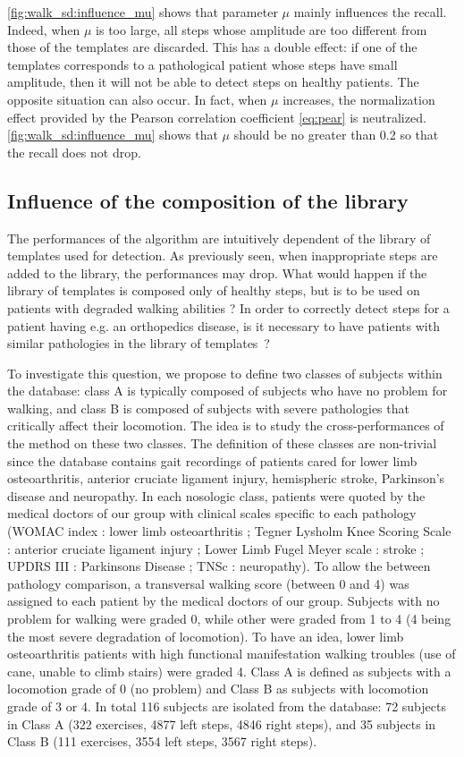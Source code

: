 \documentclass[../thesis.tex]{subfiles}
\begin{document}
\autoref{fig:walk_sd:influence_mu} shows that parameter $\mu$ mainly influences the recall. Indeed, when $\mu$ is too large, all steps whose amplitude are too different from those of the templates are discarded. This has a double effect: if one of the templates corresponds to a pathological patient whose steps have small amplitude, then it will not be able to detect steps on healthy patients. The opposite situation can also occur. In fact, when $\mu$ increases, the normalization effect provided by the Pearson correlation coefficient \eqref{eq:pear} is neutralized. \autoref{fig:walk_sd:influence_mu} shows that $\mu$ should be no greater than 0.2 so that the recall does not drop.



\subsection{Influence of the composition of the library}
\label{sub:walk_sd:library}

The performances of the algorithm are intuitively dependent of the library of templates used for detection. As previously seen, when inappropriate steps are added to the library, the performances may drop.  What would happen if the library of templates is composed only of healthy steps, but is to be used on patients with degraded walking abilities ? In order to correctly detect steps for a patient having e.g. an orthopedics disease, is it necessary to have patients with similar pathologies in the library of templates~? 

To investigate this question, we propose to define two classes of subjects within the database: class A is typically composed of subjects who have no problem for walking, and class B is composed of subjects with severe pathologies that critically affect their locomotion. The idea is to study the cross-performances of the method on these two classes. The definition of these classes are non-trivial since the database contains gait recordings of patients cared for lower limb osteoarthritis, anterior cruciate ligament injury, hemispheric stroke, Parkinson’s disease and neuropathy. In each nosologic class, patients were quoted by the medical doctors of our group with  clinical scales specific to each pathology (WOMAC index : lower limb osteoarthritis ; Tegner Lysholm Knee Scoring Scale : anterior cruciate ligament injury ; Lower Limb Fugel Meyer scale : stroke ; UPDRS III : Parkinsons Disease ; TNSc : neuropathy). To allow the between pathology comparison, a transversal walking score (between 0 and 4) was 
assigned to each patient by the medical doctors of our group.  Subjects with no problem for walking were graded 0, while other were graded from 1 to 4 (4 being the most severe degradation of locomotion). To have an idea, lower limb osteoarthritis patients with high functional manifestation walking troubles (use of cane, unable to climb stairs) were graded 4. Class A is defined as subjects with a locomotion grade of 0 (no problem) and Class B as subjects with locomotion grade of 3 or 4. In total  116 subjects are isolated from the database: 72 subjects in Class A (322 exercises, 4877 left steps, 4846 right steps), and 35  subjects in Class B (111 exercises, 3554 left steps, 3567 right steps). 
\end{document}
